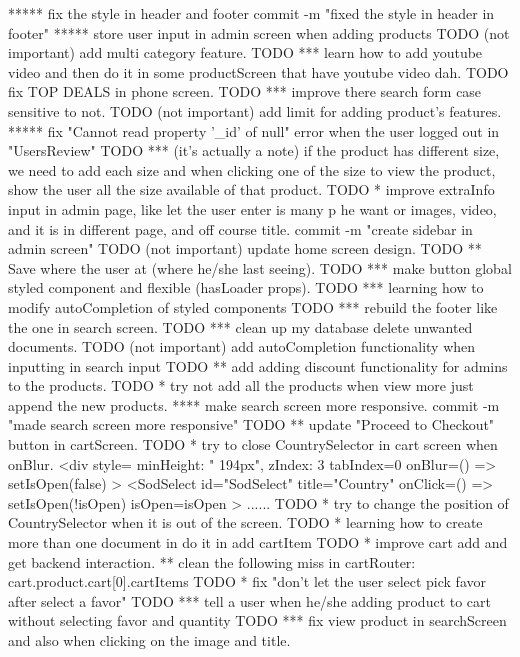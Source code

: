 {***** fix the style in header and footer
      commit -m "fixed the style in header in footer"
***** store user input in admin screen when adding products
TODO (not important) add multi category feature.
TODO *** learn how to add youtube video and then do it in some productScreen that have youtube video dah.
TODO fix TOP DEALS in phone screen. 
TODO *** improve there search form case sensitive to not.
TODO (not important) add limit for adding product's features. 
***** fix "Cannot read property '_id' of null" error when the user logged out in "UsersReview"
TODO *** (it's actually a note) if the product has different size, we need to add each size and when
          clicking one of the size to view the product, show the user all the size available of that product.
TODO * improve extraInfo input in admin page, like let the user enter is many p he want or images,
       video, and it is in different page, and off course title.
commit -m "create sidebar in admin screen"
TODO (not important) update home screen design.
TODO ** Save where the user at (where he/she last seeing).
TODO *** make button global styled component and flexible (hasLoader props).
TODO *** learning how to modify autoCompletion of styled components 
TODO *** rebuild the footer like the one in search screen.
TODO *** clean up my database delete unwanted documents.
TODO (not important) add autoCompletion functionality when inputting in search input
TODO ** add adding discount functionality for admins to the products.
TODO * try not add all the products when view more just append the new products.
**** make search screen more responsive.
    commit -m "made search screen more responsive"
TODO ** update "Proceed to Checkout" button in cartScreen.
TODO * try to close CountrySelector in cart screen when onBlur.
      <div
      style={{ minHeight: " 194px", zIndex: 3 }}
      tabIndex={0}
      onBlur={() => setIsOpen(false)}
    >
      <SodSelect
        id="SodSelect"
        title="Country"
        onClick={() => setIsOpen(!isOpen)}
        isOpen={isOpen}
      >
      ......
TODO * try to change the position of CountrySelector when it is out of the screen.
TODO * learning how to create more than one document in do it in add cartItem
TODO * improve cart add and get backend interaction.
** clean the following miss in cartRouter: 
      cart.product.cart[0].cartItems
TODO * fix "don't let the user select pick favor after select a favor"
TODO *** tell a user when he/she adding product to cart without selecting favor and quantity
TODO *** fix view product in searchScreen and also when clicking on the image and title.
}
